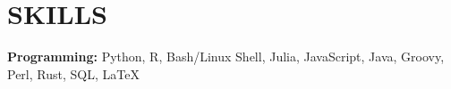\documentclass[a4paper,9pt]{extarticle}
\begin{document}

    

\section*{SKILLS}
\noindent
\textbf{Programming:} Python, R, Bash/Linux Shell, Julia, JavaScript, Java, Groovy, Perl, Rust, SQL, \LaTeX\ %
\end{document}
